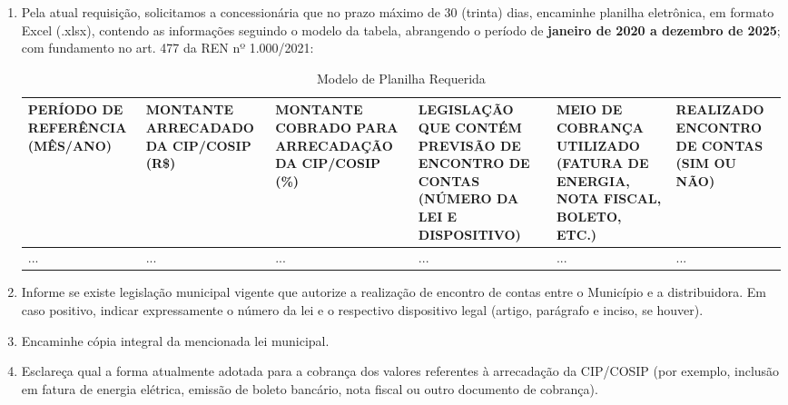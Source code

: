\begin{enumerate}[resume]
\item Pela atual requisição, solicitamos a concessionária que no prazo máximo de 30 (trinta) dias, encaminhe planilha eletrônica, em formato Excel (.xlsx), contendo as informações seguindo o modelo da tabela, abrangendo o período de \textbf{janeiro de 2020 a dezembro de 2025}; com fundamento no art. 477 da REN nº 1.000/2021:

\begin{table}[ht]
\centering
\caption{Modelo de Planilha Requerida}

{\fontsize{7}{9}\selectfont

\begin{tabularx}{\textwidth}{|
>{\centering\arraybackslash}X|
>{\centering\arraybackslash}X|
>{\centering\arraybackslash}X|
>{\raggedright\arraybackslash}X|
>{\raggedright\arraybackslash}X|
>{\centering\arraybackslash}X|}
\hline

\textbf{PERÍODO DE REFERÊNCIA (MÊS/ANO)} &
\textbf{MONTANTE ARRECADADO DA CIP/COSIP (R\$)} &
\textbf{MONTANTE COBRADO PARA ARRECADAÇÃO DA CIP/COSIP (\%)} &
\textbf{LEGISLAÇÃO QUE CONTÉM PREVISÃO DE ENCONTRO DE CONTAS (NÚMERO DA LEI E DISPOSITIVO)} &
\textbf{MEIO DE COBRANÇA UTILIZADO (FATURA DE ENERGIA, NOTA FISCAL, BOLETO, ETC.)} &
\textbf{REALIZADO ENCONTRO DE CONTAS (SIM OU NÃO)} \\
\hline

... &
... &
... &
... &
... &
... \\
\hline

\end{tabularx}

}

\end{table}

\item Informe se existe legislação municipal vigente que autorize a realização de encontro de contas entre o Município e a distribuidora. Em caso positivo, indicar expressamente o número da lei e o respectivo dispositivo legal (artigo, parágrafo e inciso, se houver).
\item Encaminhe cópia integral da mencionada lei municipal.
\item Esclareça qual a forma atualmente adotada para a cobrança dos valores referentes à arrecadação da CIP/COSIP (por exemplo, inclusão em fatura de energia elétrica, emissão de boleto bancário, nota fiscal ou outro documento de cobrança).
\end{enumerate}